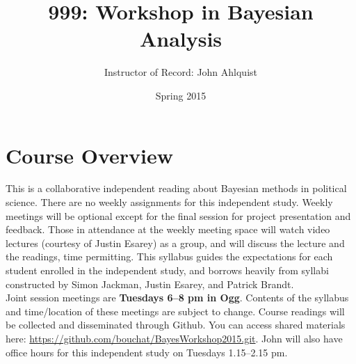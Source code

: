 \documentclass[11pt, leqno, fleqn]{article}
\title{\Large{999: Workshop in Bayesian Analysis \vspace{-2ex}}}
\author{\vspace{-1ex}\normalsize{Instructor of Record: John Ahlquist}}
\date{\vspace{-1ex}\normalsize{Spring 2015}}
\begin{document}
\maketitle
\vspace{-20pt}
\section*{Course Overview}
\noindent This is a collaborative independent reading about Bayesian methods in political science. There are no weekly assignments for this independent study. Weekly meetings will be optional except for the final session for project presentation and feedback. Those in attendance at the weekly meeting space will watch video lectures (courtesy of Justin Esarey) as a group, and will discuss the lecture and the readings, time permitting. This syllabus guides the expectations for each student enrolled in the independent study, and borrows heavily from syllabi constructed by Simon Jackman, Justin Esarey, and Patrick Brandt.\\

\noindent Joint session meetings are {\bf Tuesdays 6--8 pm in Ogg}. Contents of the syllabus and time/location of these meetings are subject to change. Course readings will be collected and disseminated through Github. You can access shared materials here: \url{https://github.com/bouchat/BayesWorkshop2015.git}. John will also have office hours for this independent study on Tuesdays 1.15--2.15 pm.\\
\end{document}
